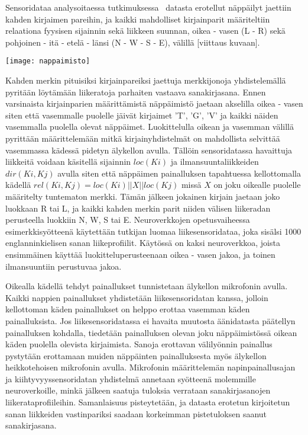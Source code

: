 \documentclass[finnish]{tktltiki2}
\theoremstyle{definition}
\theoremstyle{remark}
\begin{document}
Sensoridataa analysoitaessa tutkimuksessa~\cite{maiti} datasta erotellut näppäilyt jaettiin kahden kirjaimen pareihin, ja kaikki mahdolliset kirjainparit määriteltiin relaationa fyysisen sijainnin sekä liikkeen suunnan, oikea - vasen (L - R) sekä pohjoinen - itä - etelä - länsi (N - W -
S - E), välillä [viittaus kuvaan].

\texttt{[image: nappaimisto]}

Kahden merkin pituisiksi kirjainpareiksi jaettuja merkkijonoja yhdistelemällä pyritään löytämään liikeratoja parhaiten vastaava sanakirjasana. Ennen varsinaista kirjainparien määrittämistä näppäimistö jaetaan akselilla oikea - vasen siten että vasemmalle puolelle jäivät kirjaimet 'T', 'G', 'V' ja kaikki näiden vasemmalla puolella olevat näppäimet. Luokittelulla oikean ja vasemman välillä pyrittään määrittelemään mitkä kirjainyhdistelmät on mahdollista selvittää vasemmassa kädessä pidetyn älykellon avulla. Tällöin sensoridatassa havaittuja liikkeitä voidaan käsitellä sijainnin $loc(Ki)$ ja ilmansuuntaliikkeiden $dir(Ki, Kj)$ avulla siten että näppäimen painalluksen tapahtuessa kellottomalla kädellä $rel(Ki, Kj) = loc(Ki) || X || loc(Kj)$ missä $X$ on joku oikealle puolelle määritelty tuntematon merkki. Tämän jälkeen jokainen kirjain jaetaan joko luokkaan R tai L, ja kaikki kahden merkin parit niiden välisen liikeradan perusteella luokkiin N, W, S tai E.
Neuroverkkojen opetusvaiheessa esimerkkisyötteenä käytettään tutkijan luomaa liikesensoridataa, joka sisälsi 1000 englanninkielisen sanan liikeprofiilit. Käytössä on kaksi neuroverkkoa, joista ensimmäinen käyttää luokitteluperusteenaan oikea - vasen jakoa, ja toinen ilmansuuntiin perustuvaa jakoa. 

Oikealla kädellä tehdyt painallukset tunnistetaan älykellon mikrofonin avulla. Kaikki nappien painallukset yhdistetään liikesensoridatan kanssa, jolloin kellottoman käden painallukset on helppo erottaa vasemman käden painalluksista. Jos liikesensoridatassa ei havaita muutosta äänidatasta päätellyn painalluksen kohdalla, tiedetään painalluksen olevan joku näppäimistössä oikean käden puolella olevista kirjaimista. Sanoja erottavan välilyönnin painallus pystytään erottamaan muiden näppäinten painalluksesta myös älykellon heikkotehoisen mikrofonin avulla. Mikrofonin määrittelemän napinpainallusajan ja kiihtyvyyssensoridatan yhdistelmä annetaan syötteenä molemmille neuroverkoille, minkä jälkeen saatuja tuloksia verrataan sanakirjasanojen liikerataprofiileihin. Samanlaisuus pisteytetään, ja datasta erotetun kirjoitetun sanan liikkeiden vastinpariksi saadaan korkeimman pistetuloksen saanut sanakirjasana. 
\end{document}
